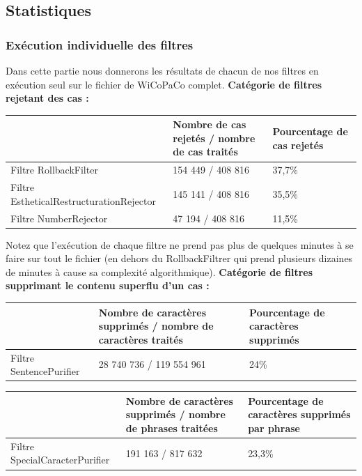 \documentclass[11pt]{article}
\begin{document}
\subsection{Statistiques}

\subsubsection{Ex\'{e}cution individuelle des filtres}
Dans cette partie nous donnerons les r\'{e}sultats de chacun de nos filtres en ex\'{e}cution seul sur le fichier de WiCoPaCo complet.
\newline
\newline
{\bfseries Cat\'{e}gorie de filtres rejetant des cas :}

\begin{center}
\begin{tabular}{|M{4cm}|M{5cm}|M{6cm}|}
   \hline
    \, &Nombre de cas rejet\'{e}s / nombre de cas trait\'{e}s & Pourcentage de cas rejet\'{e}s \tabularnewline
   \hline
    Filtre RollbackFilter & 154 449 / 408 816 & 37,7\% \tabularnewline
   \hline
    Filtre EstheticalRestructurationRejector & 145 141 / 408 816 & 35,5\% \tabularnewline
   \hline
      Filtre NumberRejector & 47 194 / 408 816 & 11,5\% \tabularnewline
   \hline
\end{tabular}
\end{center}

Notez que l'ex\'{e}cution de chaque filtre ne prend pas plus de quelques minutes \`{a} se faire sur tout le fichier (en dehors du RollbackFiltrer qui prend plusieurs dizaines de minutes \`{a} cause sa complexit\'{e} algorithmique).
\newline
\newline
{\bfseries Cat\'{e}gorie de filtres supprimant le contenu superflu d'un cas :}

\begin{center}
\begin{tabular}{|M{4cm}|M{5cm}|M{6cm}|}
   \hline
    \, &Nombre de caract\`{e}res supprim\'{e}s / nombre de caract\`{e}res trait\'{e}s & Pourcentage de caract\`{e}res supprim\'{e}s \tabularnewline
   \hline
    Filtre SentencePurifier & 28 740 736 / 119 554 961 & 24\% \tabularnewline
   \hline
\end{tabular}
\end{center}


\begin{center}
\begin{tabular}{|M{4cm}|M{5cm}|M{6cm}|}
   \hline
    \, &Nombre de caract\`{e}res supprim\'{e}s / nombre de phrases trait\'{e}es & Pourcentage de caract\`{e}res supprim\'{e}s par phrase\tabularnewline
   \hline
    Filtre SpecialCaracterPurifier & 191 163 / 817 632 & 23,3\% \tabularnewline
   \hline
\end{tabular}
\end{center}
\end{document}
